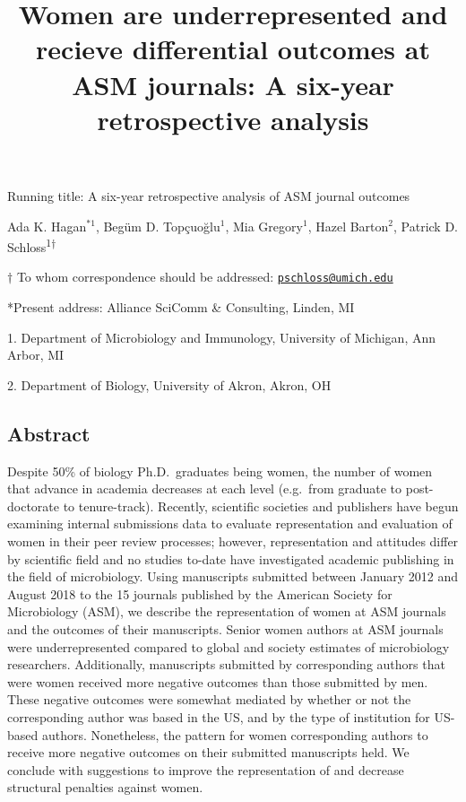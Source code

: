 \documentclass[11pt,]{article}
\title{\textbf{Women are underrepresented and recieve differential outcomes at
ASM journals: A six-year retrospective analysis}}
\author{}
\date{\vspace{-2.5em}}
\begin{document}
\maketitle

\vspace{35mm}

Running title: A six-year retrospective analysis of ASM journal outcomes

\vspace{35mm}

Ada K. Hagan\(^{*1}\), Begüm D. Topçuoğlu\({^1}\), Mia Gregory\({^1}\),
Hazel Barton\({^2}\), Patrick D. Schloss\textsuperscript{1\(\dagger\)}

\vspace{40mm}

\(\dagger\) To whom correspondence should be addressed:
\href{mailto:pschloss@umich.edu}{\nolinkurl{pschloss@umich.edu}}

*Present address: Alliance SciComm \& Consulting, Linden, MI

1. Department of Microbiology and Immunology, University of Michigan,
Ann Arbor, MI

2. Department of Biology, University of Akron, Akron, OH

\newpage

\linenumbers

\subsection{Abstract}\label{abstract}

Despite 50\% of biology Ph.D.~graduates being women, the number of women
that advance in academia decreases at each level (e.g.~from graduate to
post-doctorate to tenure-track). Recently, scientific societies and
publishers have begun examining internal submissions data to evaluate
representation and evaluation of women in their peer review processes;
however, representation and attitudes differ by scientific field and no
studies to-date have investigated academic publishing in the field of
microbiology. Using manuscripts submitted between January 2012 and
August 2018 to the 15 journals published by the American Society for
Microbiology (ASM), we describe the representation of women at ASM
journals and the outcomes of their manuscripts. Senior women authors at
ASM journals were underrepresented compared to global and society
estimates of microbiology researchers. Additionally, manuscripts
submitted by corresponding authors that were women received more
negative outcomes than those submitted by men. These negative outcomes
were somewhat mediated by whether or not the corresponding author was
based in the US, and by the type of institution for US-based authors.
Nonetheless, the pattern for women corresponding authors to receive more
negative outcomes on their submitted manuscripts held. We conclude with
suggestions to improve the representation of and decrease structural
penalties against women.
\end{document}
